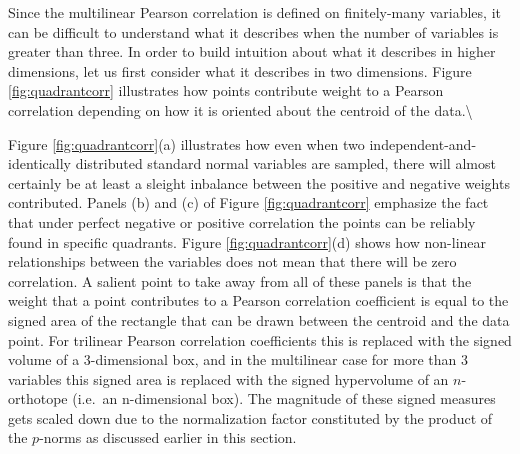 \documentclass[
  letterpaper,
  DIV=11,
  numbers=noendperiod]{scrreprt}
\begin{document}
Since the multilinear Pearson correlation is defined on finitely-many
variables, it can be difficult to understand what it describes when the
number of variables is greater than three. In order to build intuition
about what it describes in higher dimensions, let us first consider what
it describes in two dimensions. Figure \ref{fig:quadrantcorr}
illustrates how points contribute weight to a Pearson correlation
depending on how it is oriented about the centroid of the
data.\textbackslash{}

Figure \ref{fig:quadrantcorr}(a) illustrates how even when two
independent-and-identically distributed standard normal variables are
sampled, there will almost certainly be at least a sleight inbalance
between the positive and negative weights contributed. Panels (b) and
(c) of Figure \ref{fig:quadrantcorr} emphasize the fact that under
perfect negative or positive correlation the points can be reliably
found in specific quadrants. Figure \ref{fig:quadrantcorr}(d) shows how
non-linear relationships between the variables does not mean that there
will be zero correlation. A salient point to take away from all of these
panels is that the weight that a point contributes to a Pearson
correlation coefficient is equal to the signed area of the rectangle
that can be drawn between the centroid and the data point. For trilinear
Pearson correlation coefficients this is replaced with the signed volume
of a 3-dimensional box, and in the multilinear case for more than 3
variables this signed area is replaced with the signed hypervolume of an
\(n\)-orthotope (i.e.~an n-dimensional box). The magnitude of these
signed measures gets scaled down due to the normalization factor
constituted by the product of the \(p\)-norms as discussed earlier in
this section.
\end{document}
